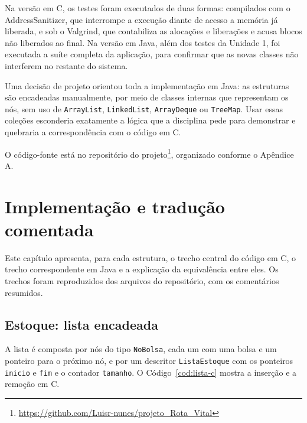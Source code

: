 \documentclass[12pt,a4paper,oneside]{report}
\newcommand{\cod}[1]{\texttt{#1}}
\begin{document}
Na versão em C, os testes foram executados de duas formas: compilados com o AddressSanitizer, que interrompe a execução diante de acesso a memória já liberada, e sob o Valgrind, que contabiliza as alocações e liberações e acusa blocos não liberados ao final. Na versão em Java, além dos testes da Unidade 1, foi executada a suíte completa da aplicação, para confirmar que as novas classes não interferem no restante do sistema.

Uma decisão de projeto orientou toda a implementação em Java: as estruturas são encadeadas manualmente, por meio de classes internas que representam os nós, sem uso de \cod{ArrayList}, \cod{LinkedList}, \cod{ArrayDeque} ou \cod{TreeMap}. Usar essas coleções esconderia exatamente a lógica que a disciplina pede para demonstrar e quebraria a correspondência com o código em C.

O código-fonte está no repositório do projeto\footnote{\url{https://github.com/Luisr-nunes/projeto_Rota_Vital}}, organizado conforme o Apêndice A.

\chapter{Implementação e tradução comentada}

Este capítulo apresenta, para cada estrutura, o trecho central do código em C, o trecho correspondente em Java e a explicação da equivalência entre eles. Os trechos foram reproduzidos dos arquivos do repositório, com os comentários resumidos.

\section{Estoque: lista encadeada}

A lista é composta por nós do tipo \cod{NoBolsa}, cada um com uma bolsa e um ponteiro para o próximo nó, e por um descritor \cod{ListaEstoque} com os ponteiros \cod{inicio} e \cod{fim} e o contador \cod{tamanho}. O Código~\ref{cod:lista-c} mostra a inserção e a remoção em C.
\end{document}
